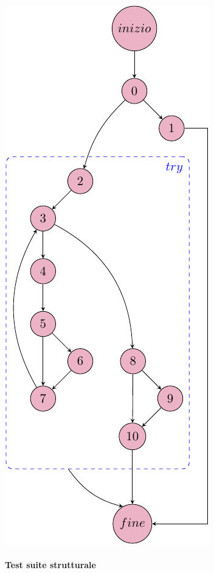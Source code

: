 \begin{minipage}[t]{0.34\linewidth}
	\vspace{0pt}
	\includegraphics{chapters/testing_white_box/cfg_creaOrdine.pdf}
\end{minipage}

\vfill
\pagebreak

\paragraph{Test suite strutturale}
